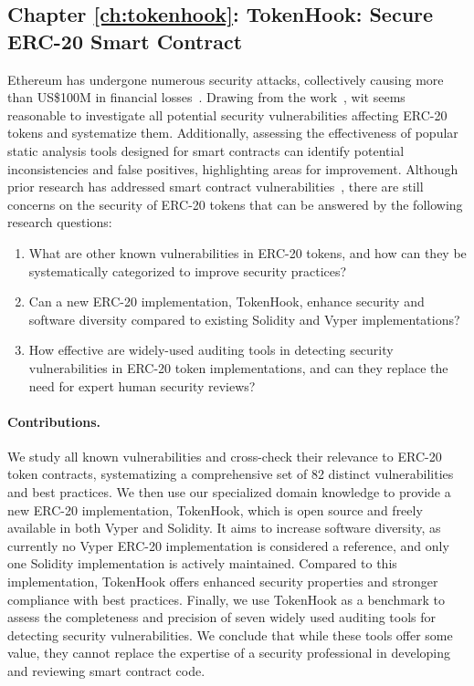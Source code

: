 \subsection{Chapter \ref{ch:tokenhook}: TokenHook: Secure ERC-20 Smart Contract}
Ethereum has undergone numerous security attacks, collectively causing more than US\$100M in financial losses~\cite{DAO1,PeckShield,PartiyMultiSig,MyEthWallet,ParityFirstHack,ParitySecondHack}. Drawing from the \mwa work~\cite{MultipleWithdrawal}, wit seems reasonable to investigate all potential security vulnerabilities affecting ERC-20 tokens and systematize them. Additionally, assessing the effectiveness of popular static analysis tools designed for smart contracts can identify potential inconsistencies and false positives, highlighting areas for improvement. Although prior research has addressed smart contract vulnerabilities~\cite{EthSecServ}, there are still concerns on the security of ERC-20 tokens that can be answered by the following research questions:
\begin{enumerate}[label={(RQ4.\arabic*)},leftmargin=*]
	\item What are other known vulnerabilities in ERC-20 tokens, and how can they be systematically categorized to improve security practices?
	\item Can a new ERC-20 implementation, TokenHook, enhance security and software diversity compared to existing Solidity and Vyper implementations?
	\item How effective are widely-used auditing tools in detecting security vulnerabilities in ERC-20 token implementations, and can they replace the need for expert human security reviews?
\end{enumerate}
\paragraph{Contributions.} We study all known vulnerabilities and cross-check their relevance to ERC-20 token contracts, systematizing a comprehensive set of 82 distinct vulnerabilities and best practices. We then use our specialized domain knowledge to provide a new ERC-20 implementation, TokenHook, which is open source and freely available in both Vyper and Solidity. It aims to increase software diversity, as currently no Vyper ERC-20 implementation is considered a reference, and only one Solidity implementation is actively maintained. Compared to this implementation, TokenHook offers enhanced security properties and stronger compliance with best practices. Finally, we use TokenHook as a benchmark to assess the completeness and precision of seven widely used auditing tools for detecting security vulnerabilities. We conclude that while these tools offer some value, they cannot replace the expertise of a security professional in developing and reviewing smart contract code.

